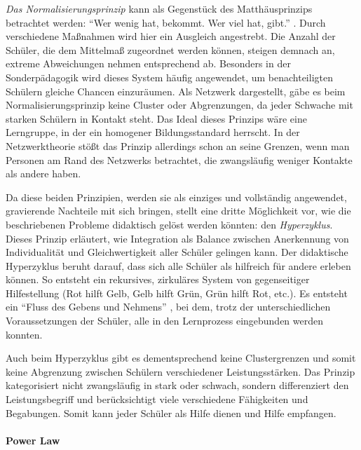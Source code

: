 \emph{Das Normalisierungsprinzip} kann als Gegenstück des Matthäusprinzips betrachtet werden: ``Wer wenig hat, bekommt. Wer viel hat, gibt.'' \parencite[12]{Zimpel2012}.
Durch verschiedene Maßnahmen wird hier ein Ausgleich angestrebt.
Die Anzahl der Schüler, die dem Mittelmaß zugeordnet werden können, steigen demnach an, extreme Abweichungen nehmen entsprechend ab.
Besonders in der Sonderpädagogik wird dieses System häufig angewendet, um benachteiligten Schülern gleiche Chancen einzuräumen.
Als Netzwerk dargestellt, gäbe es beim Normalisierungsprinzip keine Cluster oder Abgrenzungen, da jeder Schwache mit starken Schülern in Kontakt steht.
Das Ideal dieses Prinzips wäre eine Lerngruppe, in der ein homogener Bildungsstandard herrscht.
In der Netzwerktheorie stößt das Prinzip allerdings schon an seine Grenzen, wenn man Personen am Rand des Netzwerks betrachtet, die zwangsläufig weniger Kontakte als andere haben.

Da diese beiden Prinzipien, werden sie als einziges und vollständig angewendet, gravierende Nachteile mit sich bringen, stellt \citeauthor{Zimpel2012} eine dritte Möglichkeit vor, wie die beschriebenen Probleme didaktisch gelöst werden könnten: den \emph{Hyperzyklus}.
Dieses Prinzip erläutert, wie Integration als Balance zwischen Anerkennung von Individualität und Gleichwertigkeit aller Schüler gelingen kann.
Der didaktische Hyperzyklus beruht darauf, dass sich alle Schüler als hilfreich für andere erleben können.
So entsteht ein rekursives, zirkuläres System von gegenseitiger Hilfestellung (Rot hilft Gelb, Gelb hilft Grün, Grün hilft Rot, etc.).
Es entsteht ein ``Fluss des Gebens und Nehmens'' \parencite[125]{Zimpel2012}, bei dem, trotz der unterschiedlichen Voraussetzungen der Schüler, alle in den Lernprozess eingebunden werden konnten.

Auch beim Hyperzyklus gibt es dementsprechend keine Clustergrenzen und somit keine Abgrenzung zwischen Schülern verschiedener Leistungsstärken.
Das Prinzip kategorisiert nicht zwangsläufig in stark oder schwach, sondern differenziert den Leistungsbegriff und berücksichtigt viele verschiedene Fähigkeiten und Begabungen.
Somit kann jeder Schüler als Hilfe dienen und Hilfe empfangen.

\paragraph{Power Law}

